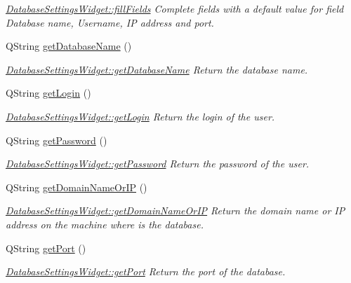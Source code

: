 \begin{DoxyCompactItemize}
\begin{DoxyCompactList}\small\item\em \hyperlink{classGui_1_1Widgets_1_1DatabaseSettingsWidget_a79e2fb995dbd14f4c4d0b54bdfaf5d5f}{Database\+Settings\+Widget\+::fill\+Fields} Complete fields with a default value for field Database name, Username, I\+P address and port. \end{DoxyCompactList}\item 
Q\+String \hyperlink{classGui_1_1Widgets_1_1DatabaseSettingsWidget_a5096ca0a98fa130fa49222b554e5dacf}{get\+Database\+Name} ()
\begin{DoxyCompactList}\small\item\em \hyperlink{classGui_1_1Widgets_1_1DatabaseSettingsWidget_a5096ca0a98fa130fa49222b554e5dacf}{Database\+Settings\+Widget\+::get\+Database\+Name} Return the database name. \end{DoxyCompactList}\item 
Q\+String \hyperlink{classGui_1_1Widgets_1_1DatabaseSettingsWidget_ad84fec6fb4c19610e3de6608be85f8cc}{get\+Login} ()
\begin{DoxyCompactList}\small\item\em \hyperlink{classGui_1_1Widgets_1_1DatabaseSettingsWidget_ad84fec6fb4c19610e3de6608be85f8cc}{Database\+Settings\+Widget\+::get\+Login} Return the login of the user. \end{DoxyCompactList}\item 
Q\+String \hyperlink{classGui_1_1Widgets_1_1DatabaseSettingsWidget_abb8ebee9842d5efc50f4309bb4a650f1}{get\+Password} ()
\begin{DoxyCompactList}\small\item\em \hyperlink{classGui_1_1Widgets_1_1DatabaseSettingsWidget_abb8ebee9842d5efc50f4309bb4a650f1}{Database\+Settings\+Widget\+::get\+Password} Return the password of the user. \end{DoxyCompactList}\item 
Q\+String \hyperlink{classGui_1_1Widgets_1_1DatabaseSettingsWidget_aebcc7341f204c1b8f8ea930154c1a331}{get\+Domain\+Name\+Or\+I\+P} ()
\begin{DoxyCompactList}\small\item\em \hyperlink{classGui_1_1Widgets_1_1DatabaseSettingsWidget_aebcc7341f204c1b8f8ea930154c1a331}{Database\+Settings\+Widget\+::get\+Domain\+Name\+Or\+I\+P} Return the domain name or I\+P address on the machine where is the database. \end{DoxyCompactList}\item 
Q\+String \hyperlink{classGui_1_1Widgets_1_1DatabaseSettingsWidget_ad2f99b62e1ae43f973fbf135ee889908}{get\+Port} ()
\begin{DoxyCompactList}\small\item\em \hyperlink{classGui_1_1Widgets_1_1DatabaseSettingsWidget_ad2f99b62e1ae43f973fbf135ee889908}{Database\+Settings\+Widget\+::get\+Port} Return the port of the database. \end{DoxyCompactList}\end{DoxyCompactItemize}


